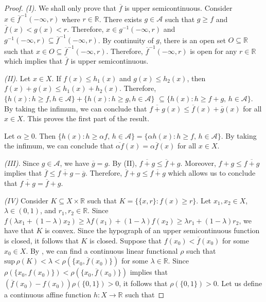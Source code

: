 \documentclass[12pt,a4paper]{amsart}
\theoremstyle{definition}
\begin{document}
	\begin{proof}
		\emph{\textnormal{(I)}}. We shall only prove that $\overline{f}$ is upper semicontinuous. Consider $x \in \overline{f}^{-1}(-\infty, r)$ where $r \in \mathbb{R}$. There exists $g \in \mathcal{A}$ such that $g \geq f$ and $\overline{f}(x)  < g(x) < r$. Therefore, $x \in g^{-1}(-\infty, r)$ and $ g^{-1}(-\infty, r) \subseteq \overline{f}^{-1}(-\infty, r)$. By continuity of $g$, there is an open set $O \subseteq \mathbb{R}$ such that $x \in O \subseteq \overline{f}^{-1}(-\infty, r)$. Therefore, $\overline{f}^{-1}(-\infty, r)$ is open for any $r \in \mathbb{R}$ which implies that $\overline{f}$ is upper semicontinuous.
		\par
		\emph{\textnormal{(II)}}. Let $x \in X$. If $f(x) \leq h_1(x)$ and $g(x) \leq h_2(x)$, then $ f(x) + g(x) \leq h_1(x) + h_2(x)$. Therefore, $\lbrace h(x): h \geq f, h \in \mathcal{A} \rbrace + \lbrace h(x): h \geq g, h \in \mathcal{A} \rbrace$ $\subseteq \lbrace h(x) : h \geq f + g, \, h \in \mathcal{A} \rbrace$. By taking the infimum, we can conclude that $\overline{f+g}(x) \leq \overline{f}(x) + \overline{g}(x)$ for all $x \in X$. This proves the first part of the result. 
		\par 
		Let $\alpha \geq 0$. Then $\lbrace h(x) : h \geq \alpha f, \, h \in \mathcal{A} \rbrace = \lbrace \alpha h(x): h \geq f, \, h \in \mathcal{A}  \rbrace$. By taking the infimum, we can conclude that $ \overline{\alpha f}(x) = \alpha \overline{f}(x)$ for all $x \in X$.  
		\par 
		\emph{\textnormal{(III)}}. Since $g \in \mathcal{A}$, we have $\overline{g} = g$. By (II), $\overline{f + g} \leq \overline{f} + g$. Moreover, $f + g \leq \overline{f+g}$ implies that $\overline{f} \leq \overline{f + g} - \overline{g}$. Therefore, $\overline{f} + g\leq \overline{f + g}$ which allows us to conclude that $\overline{f + g} = \overline{f} + g$.
		\par 
		\emph{\textnormal{(IV)}} Consider $K \subseteq X \times \mathbb{R}$ such that $K = \lbrace \lbrace x, r \rbrace : f(x) \geq r \rbrace$. Let $x_1, x_2 \in X$, $\lambda \in (0,1)$, and $r_1, r_2 \in \mathbb{R}$. Since $f( \lambda x_1 + (1- \lambda) x_2) \geq \lambda f(x_1) + (1-\lambda) f(x_2) \geq \lambda r_1 + (1-\lambda) r_2$, we have that $K$ is convex. Since the hypograph of an upper semicontinuous function is closed, it follows that $K$ is closed. Suppose that $f(x_0) < \overline{f}(x_0)$ for some $x_0 \in X$. By \cite[Corollary 1.2.12]{kadison-vol-1}, we can find a continuous linear functional $\rho$ such that $\text{sup} \, \rho(K) < \lambda < \rho (\lbrace x_0, \overline{f}(x_0) \rbrace)$ for some $\lambda \in \mathbb{R}$. Since $ \rho( \lbrace x_0, f(x_0) \rbrace) < \rho( \lbrace x_0, \overline{f}(x_0) \rbrace)$ implies that $(\overline{f}(x_0) - f(x_0)) \rho (\lbrace 0,1 \rbrace) > 0$, it follows that $\rho (\lbrace 0,1 \rbrace) > 0$. Let us define a continuous affine function $h : X \rightarrow \mathbb{R}$ such that 

\end{proof}
\end{document}
